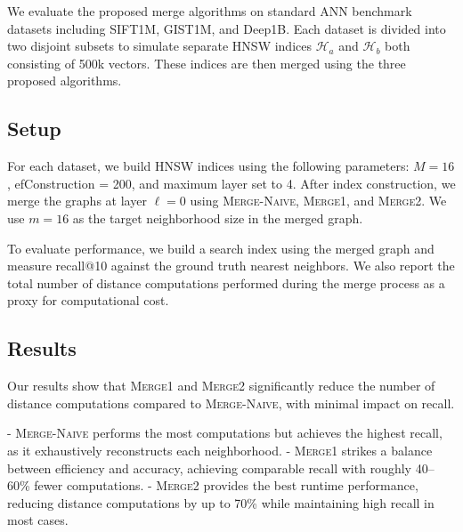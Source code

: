 \documentclass{article}
\begin{document}
We evaluate the proposed merge algorithms on standard ANN benchmark datasets including SIFT1M, GIST1M, and Deep1B.
Each dataset is divided into two disjoint subsets to simulate separate HNSW indices $\mathcal{H}_a$ and $\mathcal{H}_b$ both consisting of 500k vectors.
These indices are then merged using the three proposed algorithms.

\subsection{Setup}

For each dataset, we build HNSW indices using the following parameters: $M = 16$, efConstruction = 200, and maximum layer set to 4.
After index construction, we merge the graphs at layer $\ell = 0$ using \textsc{Merge-Naive}, \textsc{Merge1}, and \textsc{Merge2}. We use $m = 16$ as the target neighborhood size in the merged graph.

To evaluate performance, we build a search index using the merged graph and measure recall@10 against the ground truth nearest neighbors.
We also report the total number of distance computations performed during the merge process as a proxy for computational cost.

\subsection{Results}

Our results show that \textsc{Merge1} and \textsc{Merge2} significantly reduce the number of distance computations compared to \textsc{Merge-Naive}, with minimal impact on recall.

- \textsc{Merge-Naive} performs the most computations but achieves the highest recall, as it exhaustively reconstructs each neighborhood.
- \textsc{Merge1} strikes a balance between efficiency and accuracy, achieving comparable recall with roughly 40–60\% fewer computations.
- \textsc{Merge2} provides the best runtime performance, reducing distance computations by up to 70\% while maintaining high recall in most cases.
\end{document}
